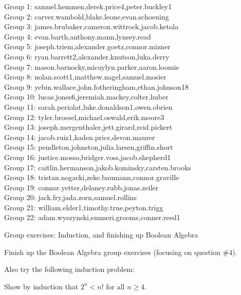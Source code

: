 \documentclass[10pt]{beamer}
\begin{document}
\begin{frame}
\footnotesize
Group 1: samuel.hemmen,derek.price4,peter.buckley1\\
Group 2: carver.wambold,blake.leone,evan.schoening\\
Group 3: james.brubaker,cameron.wittrock,jacob.ketola\\
Group 4: evan.barth,anthony.mann,lynsey.read\\
Group 5: joseph.triem,alexander.goetz,connor.mizner\\
Group 6: ryan.barrett2,alexander.knutson,luka.derry\\
Group 7: mason.barnocky,micaylyn.parker,aaron.loomis\\
Group 8: nolan.scott1,matthew.nagel,samuel.mosier\\
Group 9: yebin.wallace,john.fotheringham,ethan.johnson18\\
Group 10: lucas.jones6,jeremiah.mackey,colter.huber\\
Group 11: sarah.periolat,luke.donaldson1,owen.obrien\\
Group 12: tyler.broesel,michael.oswald,erik.moore3\\
Group 13: joseph.mergenthaler,jett.girard,reid.pickert\\
Group 14: jacob.ruiz1,kaden.price,devon.maurer\\
Group 15: pendleton.johnston,julia.larsen,griffin.short\\
Group 16: justice.mosso,bridger.voss,jacob.shepherd1\\
Group 17: caitlin.hermanson,jakob.kominsky,carsten.brooks\\
Group 18: tristan.nogacki,zeke.baumann,connor.graville\\
Group 19: connor.yetter,delaney.rubb,jonas.zeiler\\
Group 20: jack.fry,jada.zorn,samuel.rollins\\
Group 21: william.elder1,timothy.true,peyton.trigg\\
Group 22: adam.wyszynski,emmeri.grooms,conner.reed1
\end{frame}


\begin{frame}{Group exercises: Induction, and finishing up Boolean Algebra}
\footnotesize 

Finish up the Boolean Algebra group exercises (focusing on question \#4).

\vfill 

Also try the following induction problem:

\begin{mygreenbox}
Show by induction that $2^n < n!$ for all $n \geq 4$.
\end{mygreenbox}
\end{frame}
\end{document}
